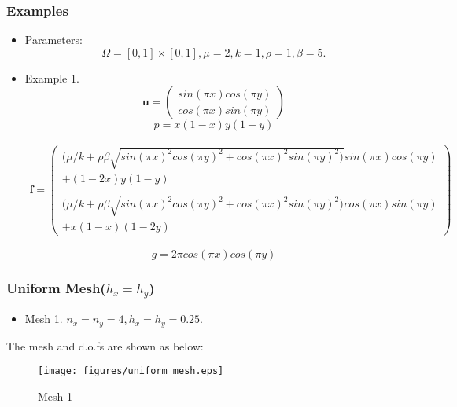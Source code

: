 \documentclass[notheorems,serif]{beamer}
\begin{document}
\begin{frame}
\frametitle{Examples}
\begin{itemize}
\item Parameters:
$$\Omega = \left[0,1\right]\times\left[0,1\right], \mu = 2, k = 1, \rho = 1, \beta = 5.$$
\item Example 1.
\small
\begin{equation*}
\boldsymbol{u} = \begin{pmatrix}
sin(\pi x)cos(\pi y) \\
cos(\pi x)sin(\pi y)
\end{pmatrix}
\end{equation*}
\begin{equation*}
p = x(1-x)y(1-y)
\end{equation*}

\begin{equation*}
\begin{split}
\boldsymbol{f} = \begin{pmatrix}
(\mu/k + \rho\beta\sqrt{sin(\pi x)^2cos(\pi y)^2 + cos(\pi x)^2sin(\pi y)^2)}sin(\pi x)cos(\pi y)\\
 + (1-2x)y(1-y) \\
 \\
(\mu/k + \rho\beta\sqrt{sin(\pi x)^2cos(\pi y)^2 + cos(\pi x)^2sin(\pi y)^2)}cos(\pi x)sin(\pi y)\\
 + x(1-x)(1-2y)
\end{pmatrix}
\end{split}
\end{equation*}

\begin{equation*}
g = 2\pi cos(\pi x)cos(\pi y)
\end{equation*}
\end{itemize}
\end{frame}

\begin{frame}
\frametitle{Uniform Mesh($h_x = h_y$)}
\begin{itemize}
\item Mesh 1. $n_x = n_y = 4, h_x = h_y = 0.25.$ 
\end{itemize}
The mesh and d.o.fs are shown as below:
\begin{figure}[H] 
\centering 
\texttt{[image: figures/uniform\_mesh.eps]} 
\caption{Mesh 1} 
\label{fig:mesh1} 
\end{figure}
\end{frame}
\end{document}
